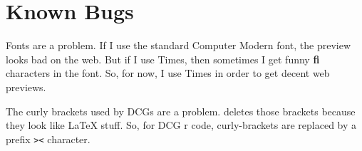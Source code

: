\section{Known Bugs}

\be
\item Fonts are a problem. If I use the standard Computer Modern
font, the preview looks bad on the web. But if I use Times, then
sometimes I get funny {\bf fi} characters in the font. So, for now, I
use Times in order to get decent web previews.
\item
The curly brackets used by DCGs are a problem. {\PROD} deletes those
brackets because they look like {\LaTeX} stuff. So, for  DCG r{\PROD} code,
curly-brackets are replaced by a prefix {\tt ><} character.
\ee
